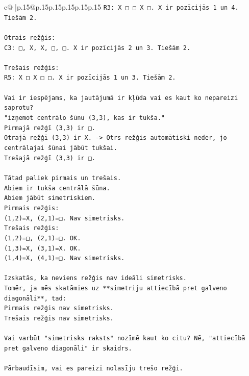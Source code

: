 \documentclass{article}
\begin{document}
{\begin{supertabular}{c@{$\;$}|p{.15\linewidth}@{}p{.15\linewidth}p{.15\linewidth}p{.15\linewidth}p{.15\linewidth}p{.15\linewidth}}
{{{\texttt{R3: X □ □ X □. X ir pozīcijās 1 un 4. Tiešām 2.} \\
\\ 
\texttt{Otrais režģis:} \\
\texttt{C3: □, X, X, □, □. X ir pozīcijās 2 un 3. Tiešām 2.} \\
\\ 
\texttt{Trešais režģis:} \\
\texttt{R5: X □ X □ □. X ir pozīcijās 1 un 3. Tiešām 2.} \\
\\ 
\texttt{Vai ir iespējams, ka jautājumā ir kļūda vai es kaut ko nepareizi saprotu?} \\
\texttt{"izņemot centrālo šūnu (3,3), kas ir tukša."} \\
\texttt{Pirmajā režģī (3,3) ir □.} \\
\texttt{Otrajā režģī (3,3) ir X. {-}> Otrs režģis automātiski neder, jo centrālajai šūnai jābūt tukšai.} \\
\texttt{Trešajā režģī (3,3) ir □.} \\
\\ 
\texttt{Tātad paliek pirmais un trešais.} \\
\texttt{Abiem ir tukša centrālā šūna.} \\
\texttt{Abiem jābūt simetriskiem.} \\
\texttt{Pirmais režģis:} \\
\texttt{(1,2)=X, (2,1)=□. Nav simetrisks.} \\
\texttt{Trešais režģis:} \\
\texttt{(1,2)=□, (2,1)=□. OK.} \\
\texttt{(1,3)=X, (3,1)=X. OK.} \\
\texttt{(1,4)=X, (4,1)=□. Nav simetrisks.} \\
\\ 
\texttt{Izskatās, ka neviens režģis nav ideāli simetrisks.} \\
\texttt{Tomēr, ja mēs skatāmies uz **simetriju attiecībā pret galveno diagonāli**, tad:} \\
\texttt{Pirmais režģis nav simetrisks.} \\
\texttt{Trešais režģis nav simetrisks.} \\
\\ 
\texttt{Vai varbūt "simetrisks raksts" nozīmē kaut ko citu? Nē, "attiecībā pret galveno diagonāli" ir skaidrs.} \\
\\ 
\texttt{Pārbaudīsim, vai es pareizi nolasīju trešo režģi.} \\
}}}
\end{supertabular}}
\end{document}
